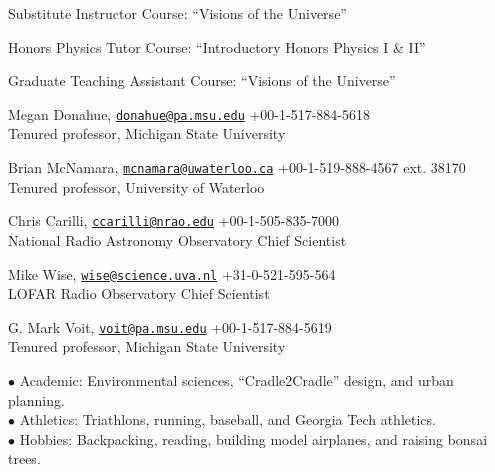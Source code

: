 \documentclass[11pt]{cv}
\begin{document}
\begin{llist}
Substitute Instructor
Course: ``Visions of the Universe''

Honors Physics Tutor
Course: ``Introductory Honors Physics I \& II''

Graduate Teaching Assistant
Course: ``Visions of the Universe''




Megan Donahue, \href{mailto:donahue@pa.msu.edu}{\tt donahue@pa.msu.edu} \hfill +00-1-517-884-5618\\
Tenured professor, Michigan State University

Brian McNamara, \href{mailto:mcnamara@uwaterloo.ca}{\tt mcnamara@uwaterloo.ca} \hfill +00-1-519-888-4567 ext. 38170\\
Tenured professor, University of Waterloo

Chris Carilli, \href{mailto:ccarilli@nrao.edu}{\tt ccarilli@nrao.edu} \hfill +00-1-505-835-7000\\
National Radio Astronomy Observatory Chief Scientist

Mike Wise, \href{mailto:wise@science.uva.nl}{\tt wise@science.uva.nl} \hfill +31-0-521-595-564\\
LOFAR Radio Observatory Chief Scientist

G. Mark Voit, \href{mailto:voit@pa.msu.edu}{\tt voit@pa.msu.edu} \hfill +00-1-517-884-5619\\
Tenured professor, Michigan State University


$\bullet$ Academic: Environmental sciences, ``Cradle2Cradle'' design, and urban planning.\\
$\bullet$ Athletics: Triathlons, running, baseball, and Georgia Tech athletics.\\
$\bullet$ Hobbies: Backpacking, reading, building model airplanes, and raising bonsai trees.

\end{llist}
\end{document}
